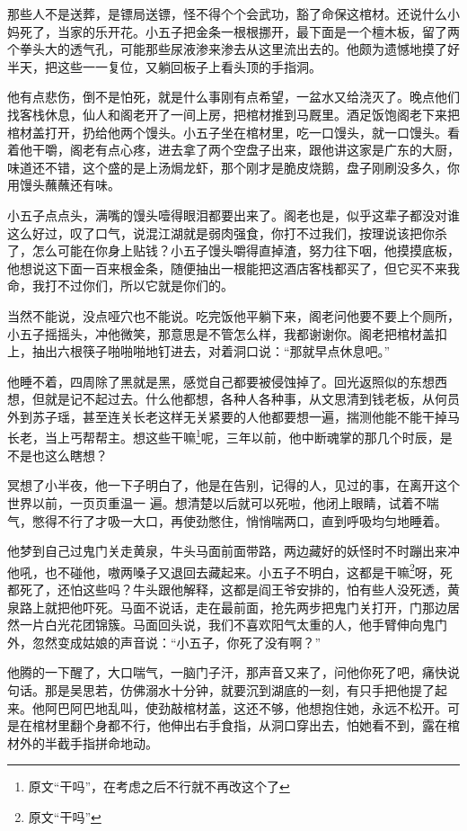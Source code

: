 那些人不是送葬，是镖局送镖，怪不得个个会武功，豁了命保这棺材。还说什么小妈死了，当家的乐开花。小五子把金条一根根挪开，最下面是一个檀木板，留了两个拳头大的透气孔，可能那些尿液渗来渗去从这里流出去的。他颇为遗憾地摸了好半天，把这些一一复位，又躺回板子上看头顶的手指洞。

他有点悲伤，倒不是怕死，就是什么事刚有点希望，一盆水又给浇灭了。晚点他们找客栈休息，仙人和阁老开了一间上房，把棺材推到马厩里。酒足饭饱阁老下来把棺材盖打开，扔给他两个馒头。小五子坐在棺材里，吃一口馒头，就一口馒头。看着他干嚼，阁老有点心疼，进去拿了两个空盘子出来，跟他讲这家是广东的大厨，味道还不错，这个盛的是上汤焗龙虾，那个刚才是脆皮烧鹅，盘子刚刷没多久，你用馒头蘸蘸还有味。

小五子点点头，满嘴的馒头噎得眼泪都要出来了。阁老也是，似乎这辈子都没对谁这么好过，叹了口气，说混江湖就是弱肉强食，你打不过我们，按理说该把你杀了，怎么可能在你身上贴钱？小五子馒头嚼得直掉渣，努力往下咽，他摸摸底板，他想说这下面一百来根金条，随便抽出一根能把这酒店客栈都买了，但它买不来我命，我打不过你们，所以它就是你们的。

当然不能说，没点哑穴也不能说。吃完饭他平躺下来，阁老问他要不要上个厕所，小五子摇摇头，冲他微笑，那意思是不管怎么样，我都谢谢你。阁老把棺材盖扣上，抽出六根筷子啪啪啪地钉进去，对着洞口说：“那就早点休息吧。”

他睡不着，四周除了黑就是黑，感觉自己都要被侵蚀掉了。回光返照似的东想西想，但就是记不起过去。什么他都想，各种人各种事，从文思清到钱老板，从何员外到苏子瑶，甚至连关长老这样无关紧要的人他都要想一遍，揣测他能不能干掉马长老，当上丐帮帮主。想这些干嘛\footnote{原文“干吗”，在考虑之后不行就不再改这个了}呢，三年以前，他中断魂掌的那几个时辰，是不是也这么瞎想？

冥想了小半夜，他一下子明白了，他是在告别，记得的人，见过的事，在离开这个世界以前，一页页重温一
遍。想清楚以后就可以死啦，他闭上眼睛，试着不喘气，憋得不行了才吸一大口，再使劲憋住，悄悄喘两口，直到呼吸均匀地睡着。

他梦到自己过鬼门关走黄泉，牛头马面前面带路，两边藏好的妖怪时不时蹦出来冲他吼，也不碰他，嗷两嗓子又退回去藏起来。小五子不明白，这都是干嘛\footnote{原文“干吗”}呀，死都死了，还怕这些吗？牛头跟他解释，这都是阎王爷安排的，怕有些人没死透，黄泉路上就把他吓死。马面不说话，走在最前面，抢先两步把鬼门关打开，门那边居然一片白光花团锦簇。马面回头说，我们不喜欢阳气太重的人，他手臂伸向鬼门外，忽然变成姑娘的声音说：“小五子，你死了没有啊？”

他腾的一下醒了，大口喘气，一脑门子汗，那声音又来了，问他你死了吧，痛快说句话。那是吴思若，仿佛溺水十分钟，就要沉到湖底的一刻，有只手把他提了起来。他阿巴阿巴地乱叫，使劲敲棺材盖，这还不够，他想抱住她，永远不松开。可是在棺材里翻个身都不行，他伸出右手食指，从洞口穿出去，怕她看不到，露在棺材外的半截手指拼命地动。

